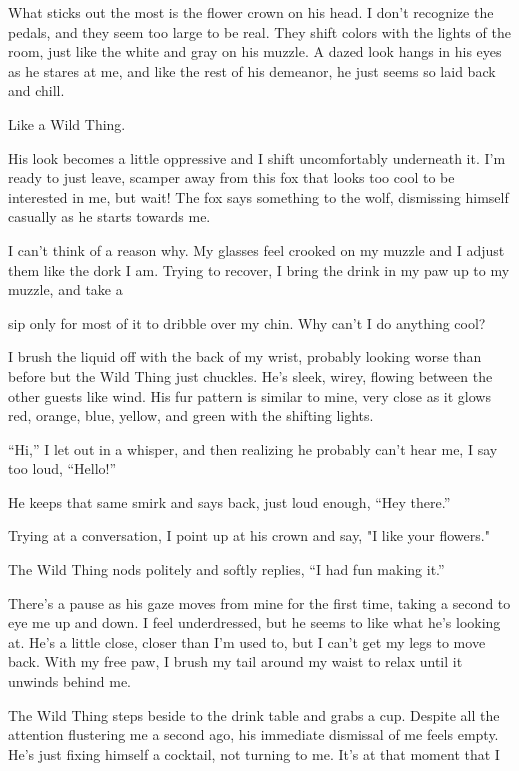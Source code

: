 What sticks out the most is the flower crown on his head. I don't
recognize the pedals, and they seem too large to be real. They shift
colors with the lights of the room, just like the white and gray on his
muzzle. A dazed look hangs in his eyes as he stares at me, and like the
rest of his demeanor, he just seems so laid back and chill.

Like a Wild Thing.

His look becomes a little oppressive and I shift uncomfortably
underneath it. I'm ready to just leave, scamper away from this fox that
looks too cool to be interested in me, but wait! The fox says something
to the wolf, dismissing himself casually as he starts towards me.

I can't think of a reason why. My glasses feel crooked on my muzzle and
I adjust them like the dork I am. Trying to recover, I bring the drink
in my paw up to my muzzle, and take a

sip only for most of it to dribble over my chin. Why can't I do anything
cool?

I brush the liquid off with the back of my wrist, probably looking worse
than before but the Wild Thing just chuckles. He's sleek, wirey, flowing
between the other guests like wind. His fur pattern is similar to mine,
very close as it glows red, orange, blue, yellow, and green with the
shifting lights.

``Hi,'' I let out in a whisper, and then realizing he probably can't hear
me, I say too loud, ``Hello!''

He keeps that same smirk and says back, just loud enough, ``Hey there.''

Trying at a conversation, I point up at his crown and say, "I like your
flowers."

The Wild Thing nods politely and softly replies, ``I had fun making it.''

There's a pause as his gaze moves from mine for the first time, taking a
second to eye me up and down. I feel underdressed, but he seems to like
what he's looking at. He's a little close, closer than I'm used to, but
I can't get my legs to move back. With my free paw, I brush my tail
around my waist to relax until it unwinds behind me.

The Wild Thing steps beside to the drink table and grabs a cup. Despite
all the attention flustering me a second ago, his immediate dismissal of
me feels empty. He's just fixing himself a cocktail, not turning to me.
It's at that moment that I


